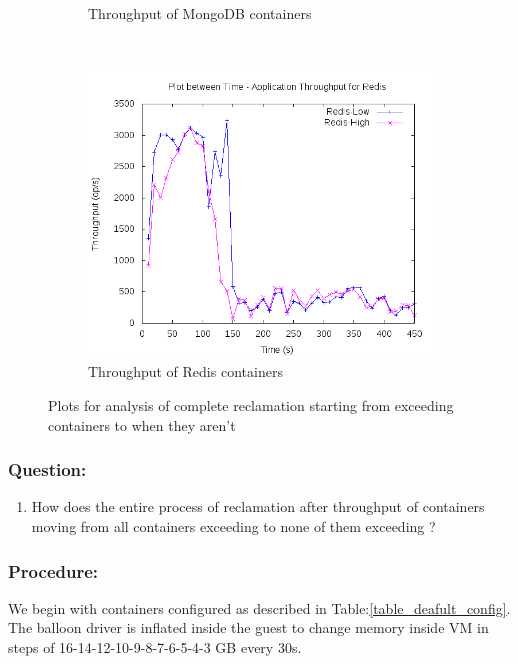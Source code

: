 \begin{figure}[t!]
\begin{subfigure}[t]{0.48\textwidth}
	    \caption{Throughput of MongoDB containers}
	    \label{plot_inference_complete_mongo}
	  \end{subfigure}
	  ~ 
	  \begin{subfigure}[t]{0.48\textwidth}
	    \centering
	    \includegraphics[width=1\textwidth]{images/inference/complete_redis.png}
	    \caption{Throughput of Redis containers}
	    \label{plot_inference_complete_redis}
	  \end{subfigure}
	  \caption{Plots for analysis of complete reclamation starting from exceeding containers to when they aren't}
	\end{figure}
	
	\subsubsection{Question:}
	  \begin{enumerate}	    
	    \item How does the entire process of reclamation after throughput of containers moving from all containers exceeding to none of 
them exceeding ?
	  \end{enumerate}	
	
	\subsubsection{Procedure:}
	  We begin with containers configured as described in Table:\ref{table_deafult_config}. The balloon driver is inflated inside the 
guest to change memory inside VM in steps of 16-14-12-10-9-8-7-6-5-4-3 GB every 30s. 
	
